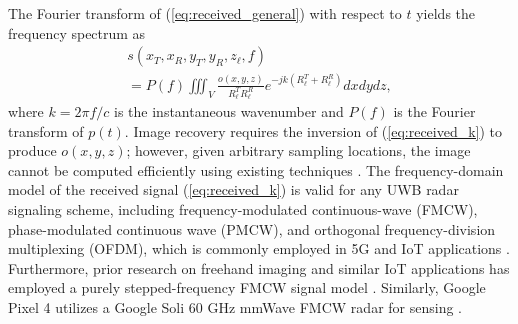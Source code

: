 \documentclass{ieeeaccess}
\begin{document}
The Fourier transform of (\ref{eq:received_general}) with respect to $t$ yields the frequency spectrum as
\begin{multline}
    \label{eq:received_k}
    s(x_T,x_R,y_T,y_R,z_\ell,f) \\ = P(f) \iiint_V \frac{o(x,y,z)}{R_\ell^T R_\ell^R} e^{-jk(R_\ell^T + R_\ell^R)} dx dy dz,
\end{multline}
where $k = 2\pi f/ c$ is the instantaneous wavenumber and $P(f)$ is the Fourier transform of $p(t)$. 
Image recovery requires the inversion of (\ref{eq:received_k}) to produce $o(x,y,z)$; however, given arbitrary sampling locations, the image cannot be computed efficiently using existing techniques \cite{alvarez2019freehand,alvarez2021freehand,alvarez2021freehandsystem,alvarez2021system,alvarez2021towards,garcia20203DSARProcessing,wu2020multilayered}.
The frequency-domain model of the received signal (\ref{eq:received_k}) is valid for any UWB radar signaling scheme, including frequency-modulated continuous-wave (FMCW), phase-modulated continuous wave (PMCW), and orthogonal frequency-division multiplexing (OFDM), which is commonly employed in 5G and IoT applications \cite{roos2019radar}. 
Furthermore, prior research on freehand imaging and similar IoT applications has employed a purely stepped-frequency FMCW signal model \cite{alvarez2019freehand,alvarez2021freehand,alvarez2021freehandsystem,alvarez2021system}. 
Similarly, Google Pixel 4 utilizes a Google Soli 60 GHz mmWave FMCW radar for sensing \cite{basrawi2021reverse}. 
\end{document}
